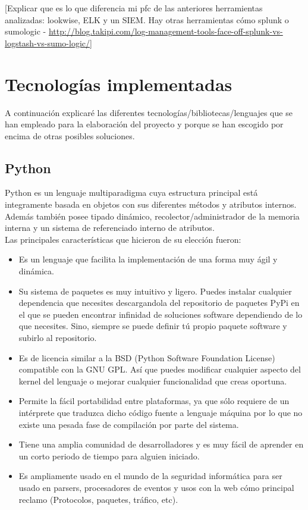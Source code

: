 [Explicar que es lo que diferencia mi pfc de las anteriores herramientas analizadas: lookwise, ELK y un SIEM. Hay otras herramientas cómo splunk o sumologic - \url{http://blog.takipi.com/log-management-tools-face-off-splunk-vs-logstash-vs-sumo-logic/}]

\section{Tecnologías implementadas}

A continuación explicaré las diferentes tecnologías/bibliotecas/lenguajes que se han empleado para la elaboración del proyecto y porque se han escogido por encima de otras posibles soluciones.

\subsection{Python}

Python es un lenguaje multiparadigma cuya estructura principal está integramente basada en objetos con sus diferentes métodos y atributos internos. Además también posee tipado dinámico, recolector/administrador de la memoria interna y un sistema de referenciado interno de atributos. \\

Las principales características que hicieron de su elección fueron:
\begin{itemize}
\item Es un lenguaje que facilita la implementación de una forma muy ágil y dinámica.
\item Su sistema de paquetes es muy intuitivo y ligero. Puedes instalar cualquier dependencia que necesites descargandola del repositorio de paquetes PyPi en el que se pueden encontrar infinidad de soluciones software dependiendo de lo que necesites. Sino, siempre se puede definir tú propio paquete software y subirlo al repositorio.
\item Es de licencia similar a la BSD (Python Software Foundation License) compatible con la GNU GPL. Así que puedes modificar cualquier aspecto del kernel del lenguaje o mejorar cualquier funcionalidad que creas oportuna.
\item Permite la fácil portabilidad entre plataformas, ya que sólo requiere de un intérprete que traduzca dicho código fuente a lenguaje máquina por lo que no existe una pesada fase de compilación por parte del sistema.
\item Tiene una amplia comunidad de desarrolladores y es muy fácil de aprender en un corto periodo de tiempo para alguien iniciado.
\item Es ampliamente usado en el mundo de la seguridad informática para ser usado en parsers, procesadores de eventos y usos con la web cómo principal reclamo (Protocolos, paquetes, tráfico, etc).
\end{itemize}


